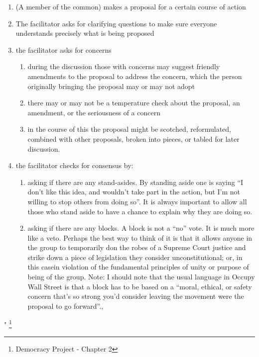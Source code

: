 \documentclass{article}
\begin{document}
\begin{enumerate}[]
	\item (A member of the common) makes a proposal for a certain course of action
	\item The facilitator asks for clarifying questions to make sure everyone understands precisely what is being proposed
	\item the facilitator asks for concerns
	\begin{enumerate}
		\item during the discussion those with concerns may suggest friendly amendments to the proposal to address the concern, which the person originally bringing the proposal may or may not adopt
		\item there may or may not be a temperature check about the proposal, an amendment, or the seriousness of a concern
		\item in the course of this the proposal might be scotched, reformulated, combined with other proposals, broken into pieces, or tabled for later discussion.
	\end{enumerate}
	\item the facilitator checks for consensus by:
	\begin{enumerate}
		\item asking if there are any stand-asides. By standing aside one is saying “I don’t like this idea, and wouldn’t take part in the action, but I’m not willing to stop others from doing so”. It is always important to allow all those who stand aside to have a chance to explain why they are doing so.

		\item asking if there are any blocks. A block is not a “no” vote. It is much more like a veto. Perhaps the best way to think of it is that it allows anyone in the group to temporarily don the robes of a Supreme Court justice and strike down a piece of legislation they consider unconstitutional; or, in this casein violation of the fundamental principles of unity or purpose of being of the group. Note: I should note that the usual language in Occupy Wall Street is that a block has to be based on a “moral, ethical, or safety concern that’s so strong you’d consider leaving the movement were the proposal to go forward”.,

	\end{enumerate}
\end{enumerate}
" \footnote{Democracy Project - Chapter 2 }
\pagebreak


\begin{center}
\end{center}
\end{document}
